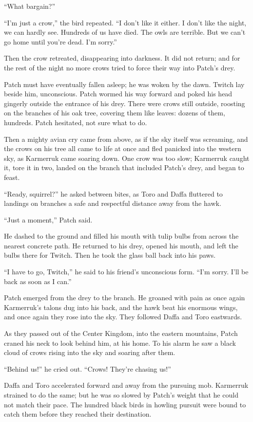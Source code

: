 \documentclass[ebook,oneside,openany,12pt]{memoir}
\begin{document}
“What bargain?”

“I’m just a crow,” the bird repeated. “I don’t like it either. I don’t
like the night, we can hardly see. Hundreds of us have died. The owls
are terrible. But we can’t go home until you’re dead. I’m sorry.”

Then the crow retreated, disappearing into darkness. It did not
return; and for the rest of the night no more crows tried to force
their way into Patch’s drey.

Patch must have eventually fallen asleep; he was woken by the
dawn. Twitch lay beside him, unconscious. Patch wormed his way forward
and poked his head gingerly outside the entrance of his drey. There
were crows still outside, roosting on the branches of his oak tree,
covering them like leaves: dozens of them, hundreds. Patch hesitated,
not sure what to do.

Then a mighty avian cry came from above, as if the sky itself was
screaming, and the crows on his tree all came to life at once and fled
panicked into the western sky, as Karmerruk came soaring down. One
crow was too slow; Karmerruk caught it, tore it in two, landed on the
branch that included Patch’s drey, and began to feast.

“Ready, squirrel?” he asked between bites, as Toro and Daffa fluttered
to landings on branches a safe and respectful distance away from the
hawk.

“Just a moment,” Patch said.

He dashed to the ground and filled his mouth with tulip bulbs from
across the nearest concrete path. He returned to his drey, opened his
mouth, and left the bulbs there for Twitch. Then he took the glass
ball back into his paws.

“I have to go, Twitch,” he said to his friend’s unconscious form. “I’m
sorry. I’ll be back as soon as I can.”

Patch emerged from the drey to the branch. He groaned with pain as
once again Karmerruk’s talons dug into his back, and the hawk beat his
enormous wings, and once again they rose into the sky. They followed
Daffa and Toro eastwards.

As they passed out of the Center Kingdom, into the eastern mountains,
Patch craned his neck to look behind him, at his home. To his alarm he
saw a black cloud of crows rising into the sky and soaring after them.

“Behind us!” he cried out. “Crows! They’re chasing us!”

Daffa and Toro accelerated forward and away from the pursuing
mob. Karmerruk strained to do the same; but he was so slowed by
Patch’s weight that he could not match their pace. The hundred black
birds in howling pursuit were bound to catch them before they reached
their destination.
\end{document}

